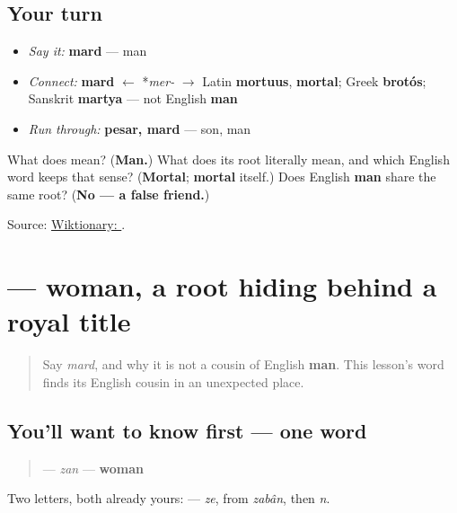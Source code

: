 \subsection*{Your turn}
\begin{itemize}
\raggedright
  \item \emph{Say it:} \textbf{mard} — man
  \item \emph{Connect:} \textbf{mard} $\leftarrow$ *\emph{mer-} $\to$ Latin \textbf{mortuus}, \textbf{mortal}; Greek \textbf{brotós}; Sanskrit \textbf{martya} — not English \textbf{man}
  \item \emph{Run through:} \textbf{pesar, mard} — son, man
\end{itemize}

\begin{tcolorbox}[breakable,colback=teal!4,colframe=teal!35!black,title={Before you move on}]
What does \textbf{} mean? (\textbf{Man.}) What does its root literally mean, and which English word keeps that sense? (\textbf{Mortal}; \textbf{mortal} itself.) Does English \textbf{man} share the same root? (\textbf{No — a false friend.})

Source: \href{https://en.wiktionary.org/wiki/\%D9\%85\%D8\%B1\%D8\%AF}{Wiktionary: }.
\end{tcolorbox}
\section[\texorpdfstring{\fa{زن} (zan)}{زن (zan)}]{ — woman, a root hiding behind a royal title}

\label{lesson:FA-C14-zan}



\begin{quote}
Say \emph{mard}, and why it is not a cousin of English \textbf{man}. This lesson's word finds its English cousin in an unexpected place.
\end{quote}

\subsection*{You'll want to know first — one word}
\begin{quote}
\textbf{} — \emph{zan} — \textbf{woman}
\end{quote}

Two letters, both already yours: \textbf{ } — \textbf{} \emph{ze}, from \emph{zabân}, then \emph{n}.

